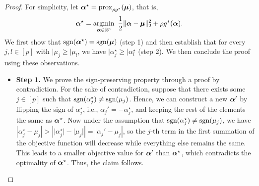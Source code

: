 \begin{proof}
    For simplicity, let $\bm{\alpha}^\star = \operatorname{prox}_{\rho g^*}(\bm{\mu})$, that is,
    \begin{align}
        \label{eq:alpha:star}
        \bm{\alpha}^\star = \operatorname*{\arg\!\min}_{\bm \alpha \in \mathbb{R}^p} ~ \frac{1}{2} \lVert \bm \alpha - \bm \mu \rVert_2^2 + \rho g^*(\bm \alpha).
    \end{align}
    We first show that $\operatorname{sgn}(\bm{\alpha}^\star) = \operatorname{sgn}(\bm{\mu})$ (step 1) and then establish that for every $j, l \in [p]$ with $\vert{\mu_j} \geq \vert{\mu_l}$, we have $\vert{\alpha_j^\star} \geq \vert{\alpha_l^\star}$ (step 2). We then conclude the proof using these observations.

    \begin{itemize}[label=$\diamond$,leftmargin=*]
        \item \textbf{Step 1.} We prove the sign-preserving property through a proof by contradiction. For the sake of contradiction, suppose that there exists some $j \in [p]$ such that $\operatorname{sgn}(\alpha_j^\star) \neq \operatorname{sgn}(\mu_j)$.
        Hence, we can construct a new $\bm{\alpha}'$ by flipping the sign of $\alpha_j^\star$, i.e., $\alpha_j' = -\alpha_j^\star$, and keeping the rest of the elements the same as $\bm{\alpha}^\star$.
        Now under the assumption that $\operatorname{sgn}(\alpha_j^\star) \neq \operatorname{sgn}(\mu_j)$, we have $\left\lvert{\alpha_j^\star - \mu_j}\right\rvert > \left\lvert{\lvert{\alpha_j^\star}\rvert - \lvert{\mu_j}\rvert}\right\rvert = \left\lvert{\alpha_j' - \mu_j}\right\rvert$, so the $j$-th term in the first summation of the objective function will decrease while everything else remains the same.
        This leads to a smaller objective value for $\bm{\alpha}'$ than $\bm{\alpha}^\star$, which contradicts the optimality of $\bm{\alpha}^\star$.
        Thus, the claim follows.
        

\end{itemize}
\end{proof}
